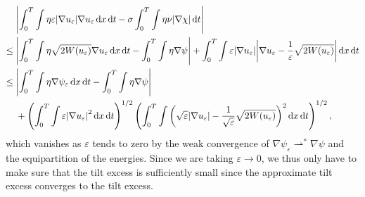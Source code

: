 \begin{align*}
	& 
	\abs{ 
	\int_{ 0 }^{ T }
		\int
			\eta
			\varepsilon
			\abs{ \nabla u_{ \varepsilon } }
			\nabla u_{ \varepsilon }
		\dd{ x }
	\dd{ t }
	-
	\sigma
	\int_{ 0 }^{ T }
		\int
			\eta
			\nu 
		\abs{ \nabla \chi }
	\dd{ t }
	}
	\\
	\leq {} &
	\abs{
		\int_{ 0 }^{ T }
			\int	
				\eta
				\sqrt{ 2 W ( u_{ \varepsilon } ) }
				\nabla u_{ \varepsilon }
			\dd{ x }
		\dd{ t }
		-
		\int_{ 0 }^{ T }
			\int
				\eta
				\nabla \psi
	}
	+
	\int_{ 0 }^{ T }
		\int
			\varepsilon
			\abs{ \nabla u_{ \varepsilon } }
			\abs{ \nabla u_{ \varepsilon } - \frac{ 1 }{ \varepsilon } \sqrt{ 2 W ( u_{ \varepsilon } ) } }
		\dd{ x }
	\dd{ t }
	\\
	\leq {} &
	\abs{
		\int_{ 0 }^{ T }
			\int
				\eta
				\nabla \psi_{ \varepsilon } 
			\dd{ x }
		\dd{ t }
		-
		\int_{ 0 }^{ T }
			\int
				\eta
				\nabla \psi 
	}
	\\
	& +
	\left(
		\int_{ 0 }^{ T }
			\int
				\varepsilon \abs{ \nabla u_{ \varepsilon } }^{ 2 }
			\dd{ x }
		\dd{ t }
	\right)^{ 1/2 }
	\left(
		\int_{ 0 }^{ T }
			\int
				\left(
					\sqrt{ \varepsilon }
					\abs{ \nabla u_{ \varepsilon } }
					-
					\frac{ 1 }{ \sqrt{ \varepsilon } }
					\sqrt{ 2 W ( u_{ \varepsilon } ) }
				\right)^{ 2 }
			\dd{ x }
		\dd{ t }
	\right)^{ 1/2 },
\end{align*}
which vanishes as $ \varepsilon $ tends to zero by the weak convergence of $ \nabla \psi_{ \varepsilon } \rightharpoonup^{ \ast } \nabla \psi $ and the equipartition of the energies.
Since we are taking $ \varepsilon \to 0 $, we thus only have to make sure that the tilt excess is sufficiently small since the approximate tilt excess converges to the tilt excess.

